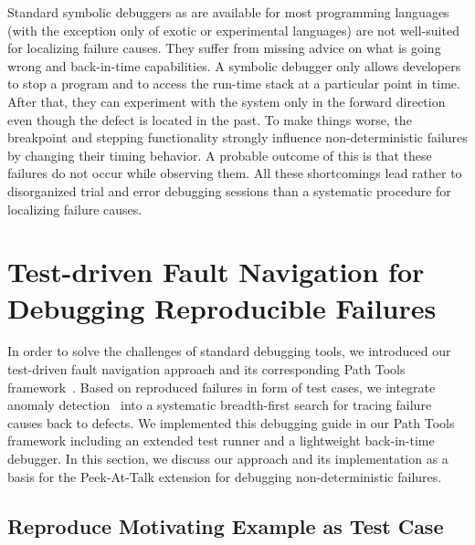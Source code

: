\documentclass[preprint,3p]{elsarticle}
\newcommand{\toolname}{Peek-At-Talk\xspace}
\begin{document}
Standard symbolic debuggers as are available for most programming languages (with the exception only of exotic or experimental languages) are not well-suited for localizing failure causes. 
They suffer from missing advice on what is going wrong and back-in-time capabilities.
A symbolic debugger only allows developers to stop a program and to access the run-time stack at a particular point in time. 
After that, they can experiment with the system only in the forward direction even though the defect is located in the past. 
To make things worse, the breakpoint and stepping functionality strongly influence non-deterministic failures by changing their timing behavior. 
A probable outcome of this is that these failures do not occur while observing them. 
All these shortcomings lead rather to disorganized trial and error debugging sessions than a systematic procedure for localizing failure causes.



\section{Test-driven Fault Navigation for Debugging Reproducible Failures}
\label{sec:pathTools}

In order to solve the challenges of standard debugging tools, we introduced our test-driven fault navigation approach and its corresponding Path Tools framework~\cite{Perscheid13}.
Based on reproduced failures in form of test cases, we integrate anomaly detection~\cite{Jones2002Vti,Ernst2007Tds} into a systematic breadth-first search for tracing failure causes back to defects.
We implemented this debugging guide in our Path Tools framework including an extended test runner and a lightweight back-in-time debugger.
In this section, we discuss our approach and its implementation as a basis for the \toolname extension for debugging non-deterministic failures.


\subsection{Reproduce Motivating Example as Test Case}
\label{sec:bugreport}
\end{document}
